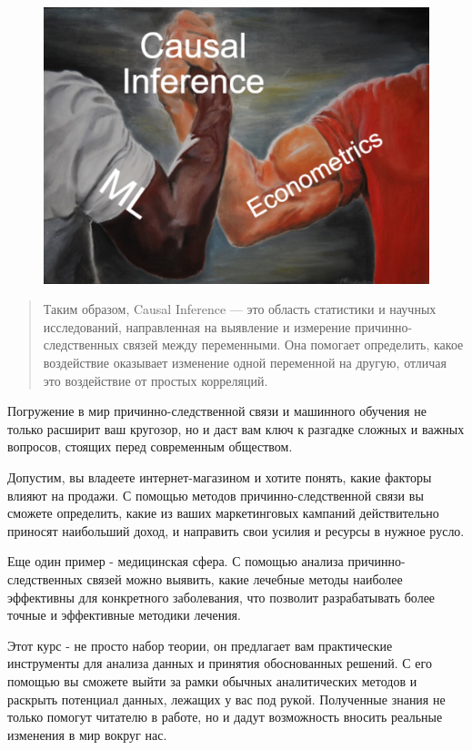 \documentclass{article}
\begin{document}
        \begin{figure}[h]
            \centering
            \includegraphics[width=0.7\linewidth]{imgs/epic_CI.jpg}
            \label{fig:mpr}
        \end{figure}
        \newpage
        \begin{quote}
           Таким образом, Causal Inference — это область статистики и научных исследований, направленная на выявление и измерение причинно-следственных связей между переменными. Она помогает определить, какое воздействие оказывает изменение одной переменной на другую, отличая это воздействие от простых корреляций.
        \end{quote}



        Погружение в мир причинно-следственной связи и машинного обучения не только расширит ваш кругозор, но и даст вам ключ к разгадке сложных и важных вопросов, стоящих перед современным обществом.

        Допустим, вы владеете интернет-магазином и хотите понять, какие факторы влияют на продажи. С помощью методов причинно-следственной связи вы сможете определить, какие из ваших маркетинговых кампаний действительно приносят наибольший доход, и направить свои усилия и ресурсы в нужное русло.

        Еще один пример - медицинская сфера. С помощью анализа причинно-следственных связей можно выявить, какие лечебные методы наиболее эффективны для конкретного заболевания, что позволит разрабатывать более точные и эффективные методики лечения.

        Этот курс - не просто набор теории, он предлагает вам практические инструменты для анализа данных и принятия обоснованных решений. С его помощью вы сможете выйти за рамки обычных аналитических методов и раскрыть потенциал данных, лежащих у вас под рукой. Полученные знания не только помогут читателю в работе, но и дадут возможность вносить реальные изменения в мир вокруг нас.
\end{document}
